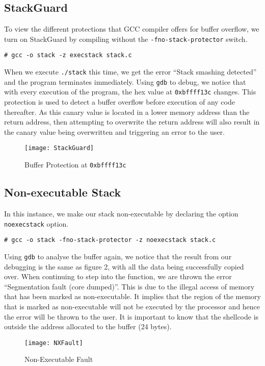 \documentclass[a4paper,12pt]{article}
\begin{document}
\subsection{StackGuard}
To view the different protections that GCC compiler offers for buffer overflow, we turn on StackGuard by compiling without the \texttt{-fno-stack-protector} switch.\begin{verbatim}
# gcc -o stack -z execstack stack.c
\end{verbatim}
When we execute \texttt{./stack} this time, we get the error ``Stack smashing detected'' and the program terminates immediately. Using \texttt{gdb} to debug, we notice that with every execution of the program, the hex value at \texttt{0xbffff13c} changes. This protection is used to detect a buffer overflow before execution of any code thereafter. As this canary value is located in a lower memory address than the return address, then attempting to  overwrite the return address will also result in the canary value being overwritten and triggering an error to the user.
\begin{figure}[H]
	\centering
	\texttt{[image: StackGuard]}
	\caption{Buffer Protection at \texttt{0xbffff13c}}
	\label{fig:stackguard}
\end{figure}
\subsection{Non-executable Stack}
In this instance, we make our stack non-executable by declaring the option \texttt{noexecstack} option.
\begin{verbatim}
# gcc -o stack -fno-stack-protector -z noexecstack stack.c
\end{verbatim}
Using \texttt{gdb} to analyse the buffer again, we notice that the result from our debugging is the same as figure 2, with all the data being successfully copied over. When continuing to step into the function, we are thrown the error ``Segmentation fault (core dumped)''. This is due to the illegal access of memory that has been marked as non-executable. It implies that the region of the memory that is marked as non-executable will not be executed by the processor and hence the error will be thrown to the user. It is important to know that the shellcode is outside the address allocated to the buffer (24 bytes).
\begin{figure}[H]
	\centering
	\texttt{[image: NXFault]}
	\caption{Non-Executable Fault}
	\label{fig:nxfault}
\end{figure}
\newpage
\end{document}
